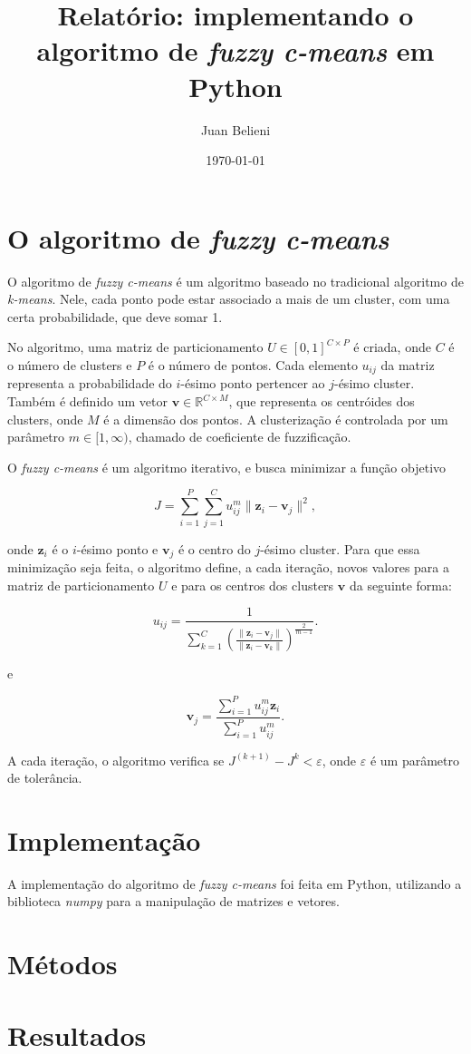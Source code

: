 \documentclass[a4paper, 11pt]{article}
\author{Juan Belieni}
\title{Relatório: implementando o algoritmo de \textit{fuzzy c-means} em Python}
\date{\today}
\newcommand{\eps}{\varepsilon} %
\begin{document}
\maketitle
\onehalfspacing

\section{O algoritmo de \textit{fuzzy c-means}}

O algoritmo de \textit{fuzzy c-means} é um algoritmo baseado no tradicional algoritmo de \textit{k-means}.
Nele, cada ponto pode estar associado a mais de um cluster, com uma certa probabilidade, que deve somar 1.

No algoritmo, uma matriz de particionamento $U \in [0, 1]^{C \times P}$ é criada, onde $C$ é o número de clusters e $P$ é o número de pontos.
Cada elemento $u_{ij}$ da matriz representa a probabilidade do $i$-ésimo ponto pertencer ao $j$-ésimo cluster.
Também é definido um vetor $\mathbf v \in \mathbb R^{C \times M}$, que representa os centróides dos clusters, onde $M$ é a dimensão dos pontos.
A clusterização é controlada por um parâmetro $m \in [1, \infty)$, chamado de coeficiente de fuzzificação.

O \textit{fuzzy c-means} é um algoritmo iterativo, e busca minimizar a função objetivo

\begin{equation}
J = \sum_{i=1}^P \sum_{j=1}^C u_{ij}^m \| \mathbf z_i - \mathbf v_j \|^2,
\end{equation}

onde $\mathbf z_i$ é o $i$-ésimo ponto e $\mathbf v_j$ é o centro do $j$-ésimo cluster.
Para que essa minimização seja feita, o algoritmo define, a cada iteração, novos valores para a matriz de particionamento $U$ e para os centros dos clusters $\mathbf v$ da seguinte forma:

\begin{equation}
u_{ij} = \frac{1}{\sum_{k=1}^C \left( \frac{\| \mathbf z_i - \mathbf v_j \|}{\| \mathbf z_i - \mathbf v_k \|} \right)^{\frac{2}{m-1}}}.
\end{equation}

e

\begin{equation}
\mathbf v_j = \frac{\sum_{i=1}^P u_{ij}^m \mathbf z_i}{\sum_{i=1}^P u_{ij}^m}.
\end{equation}

A cada iteração, o algoritmo verifica se $J^{(k + 1)} - J^k < \eps$, onde $\eps$ é um parâmetro de tolerância.

\section{Implementação}

A implementação do algoritmo de \textit{fuzzy c-means} foi feita em Python, utilizando a biblioteca \textit{numpy} para a manipulação de matrizes e vetores.



\section{Métodos}

\section{Resultados}
\end{document}
